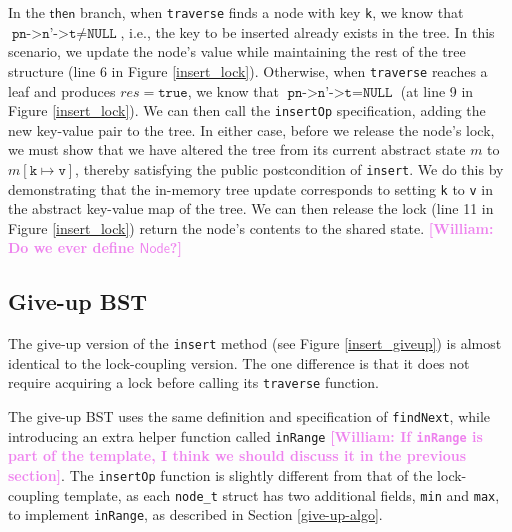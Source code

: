 \documentclass[a4paper,UKenglish,cleveref, autoref, thm-restate]{lipics-v2021}
\newcommand{\treerep}{\ensuremath{\mathsf{Node}}}
\newcommand{\wm}[1]{\textbf{\textcolor{violet}{[William: #1]}}}
\begin{document}
In the $\mathsf{then}$ branch, when \texttt{traverse} finds a node with key \lstinline{k}, %
we know that $\texttt{pn->n'->t} \neq \texttt{NULL}$, i.e., the key to be inserted already exists in the tree. In this scenario, we update the node's value while maintaining the rest of the tree structure (line 6 in Figure \ref{insert_lock}). Otherwise, when \texttt{traverse} reaches a leaf and produces $\mathit{res} = \texttt{true}$, we know that $\texttt{pn->n'->t} = \texttt{NULL}$ (at line 9 in Figure \ref{insert_lock}). We can then call the \texttt{insertOp} specification, adding the new key-value pair to the tree. In either case, before we release the node's lock, we must show that we have altered the tree from its current abstract state $m$ to $m[\texttt{k} \mapsto \texttt{v}]$, thereby satisfying the public postcondition of \lstinline{insert}. We do this by demonstrating that the in-memory tree update corresponds to setting \lstinline{k} to \lstinline{v} in the abstract key-value map of the tree. 
We can then release the lock (line 11 in Figure \ref{insert_lock}) return the node's contents to the shared state. %
\wm{Do we ever define $\treerep$?}

\subsection{Give-up BST}

The give-up version of the \texttt{insert} method (see Figure \ref{insert_giveup}) is almost identical to the lock-coupling version. The one difference is that it does not require acquiring a lock before calling its \texttt{traverse} function. 

The give-up BST uses the same definition and specification of \texttt{findNext}, while introducing an extra helper function called \texttt{inRange} \wm{If \lstinline{inRange} is part of the template, I think we should discuss it in the previous section}. The \texttt{insertOp} function is slightly different from that of the lock-coupling template, as each \lstinline{node_t} struct has two additional fields, \texttt{min} and \texttt{max}, to implement \lstinline{inRange}, as described in Section \ref{give-up-algo}.
\end{document}

